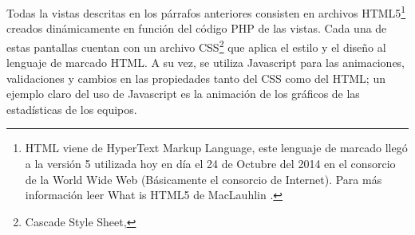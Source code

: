 		
		Todas la vistas descritas en los párrafos anteriores consisten en archivos HTML5\footnote{HTML viene de HyperText Markup Language, este lenguaje de marcado llegó a la versión 5 utilizada hoy en día el 24 de Octubre del 2014 en el consorcio de la World Wide Web (Básicamente el consorcio de Internet). Para más información leer What is HTML5 de MacLauhlin \cite{mclaughlin2011html5}.} creados dinámicamente en función del código PHP de las vistas. Cada una de estas pantallas cuentan con un archivo CSS\footnote{Cascade Style Sheet, } que aplica el estilo y el diseño al lenguaje de marcado HTML. A su vez, se utiliza Javascript para las animaciones, validaciones y cambios en las propiedades tanto del CSS como del HTML; un ejemplo claro del uso de Javascript es la animación de los gráficos de las estadísticas de los equipos.
		
